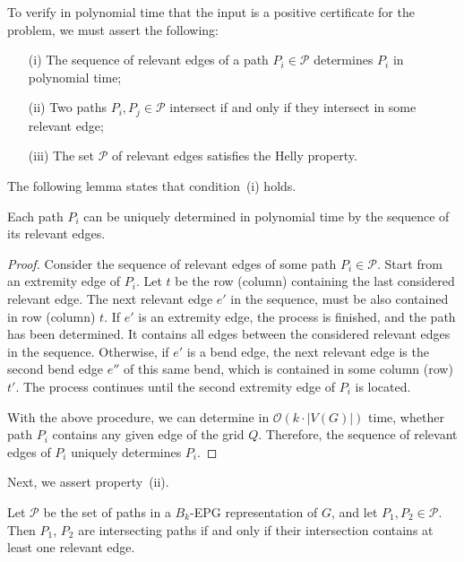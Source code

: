 To verify in polynomial time that the input is a positive certificate for the problem, we must assert the following:

\begin{enumerate}%
\item[(i)] The sequence of relevant edges of a path $P_i\in \mathcal{P}$ determines $P_i$ in polynomial time; \label{it:bullet1}

\item[(ii)] Two paths $P_i, P_j \in \mathcal{P}$ intersect if and only if they intersect in some relevant edge; \label{it:bullet2}

\item[(iii)] The set $\mathcal{P}$ of relevant edges satisfies the Helly property.  \label{it:bullet3}
\end{enumerate}



The following lemma states that condition~(i) holds. 



\begin{lemma}\label{lem:verify1}
Each path $P_i$ can be uniquely determined in polynomial time by the sequence of its relevant edges.
\end{lemma}
\begin{proof}
Consider the sequence of relevant edges of some path $P_i\in \mathcal{P}$. Start from an extremity edge of $P_i$. Let $t$ be the row (column) containing the last considered relevant edge. The next relevant edge $e'$ in the sequence, must be also contained in row (column) $t$. If $e'$ is an extremity edge, the process is finished, and the path has been determined. It contains all edges between the considered relevant edges in the sequence. Otherwise, if $e'$ is a bend edge, the next relevant edge is the second bend edge $e''$ of this same bend, which is contained in some column (row) $t'$. The process continues until the second extremity edge of $P_i$ is located. 

With the above procedure, we can determine in $\mathcal{O}(k\cdot |V(G)|)$ time, whether path $P_i$ contains any given edge of the grid $Q$. Therefore, the sequence of relevant edges of $P_i$ uniquely determines $P_i$.
 \end{proof}

Next, we assert property~(ii).

\begin{lemma}\label{lem:relevantEdges}
Let $\mathcal{P}$ be the set of paths in a $B_k$-EPG representation of $G$, and let $P_1, P_2\in \mathcal{P}$. Then $P_1$, $P_2$ are intersecting paths if and only if their intersection contains at least one relevant edge.
\end{lemma}

